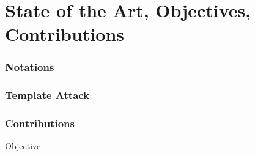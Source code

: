 \section{State of the Art, Objectives, Contributions}

\begin{frame}
\frametitle{Notations}

\end{frame}

\begin{frame}
\frametitle{Template Attack} 

\end{frame}

\begin{frame}
\frametitle{Contributions}
\begin{block}{Objective}

\end{block}
\end{frame}